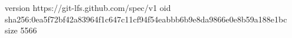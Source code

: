 version https://git-lfs.github.com/spec/v1
oid sha256:0ea5f72bf42a83964f1c647c11cf94f54eabbb6b9e8da9866e0e8b59a188e1bc
size 5566
